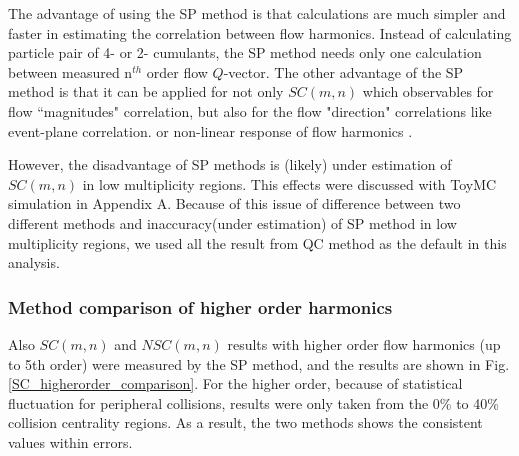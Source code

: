 The advantage of using the SP method is that calculations are much simpler and faster in estimating the correlation between flow harmonics. Instead of calculating particle pair of 4- or 2- cumulants, the SP method needs only one calculation between measured n$^{th}$ order flow $Q$-vector. The other advantage of the SP method is that it can be applied for not only $SC(m,n)$ which observables for flow ``magnitudes" correlation, but also for the flow "direction" correlations like event-plane correlation. \cite{Aad:2014fla} or non-linear response of flow harmonics \cite{Yan:2015dh}. 

However, the disadvantage of SP methods is (likely) under estimation of $SC(m,n)$ in low multiplicity regions. This effects were discussed with ToyMC simulation in Appendix A. Because of this issue of difference between two different methods and inaccuracy(under estimation) of SP method in low multiplicity regions, we used all the result from QC method as the default in this analysis.


\subsubsection{Method comparison of higher order harmonics}


Also $SC(m,n)$ and $NSC(m,n)$ results with higher order flow harmonics (up to 5th order) were measured by the SP method, and the results are shown in Fig.\ref{SC_higherorder_comparison}. For the higher order, because of statistical fluctuation for peripheral collisions, results were only taken from the 0\% to 40\% collision centrality regions. As a result, the two methods shows the consistent values within errors.



